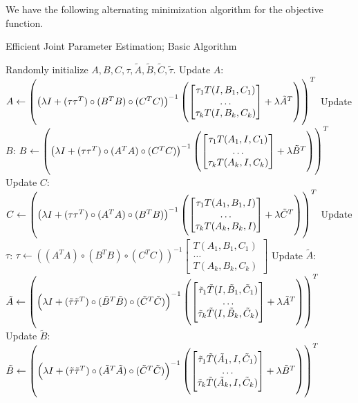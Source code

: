 \documentclass{article}
\begin{document}
We have the following alternating minimization algorithm for the objective function.

\begin{algorithm}
  \caption{Efficient Joint Parameter Estimation; Basic Algorithm}
\begin{algorithmic}[H]
\STATE Randomly initialize $A, B, C, \tau, \tilde A, \tilde B, \tilde C, \tilde \tau$.
\STATE Update $A$: $A \gets \del{\del{\lambda I + (\tau \tau^T) \circ (B^T B) \circ (C^T C)}^{-1} \del{\begin{bmatrix} \tau_1 T(I, B_1, C_1) \\ \ldots \\ \tau_k T(I, B_k, C_k) \end{bmatrix} + \lambda \tilde A^T}}^T$
\STATE Update $B$: $B \gets \del{\del{\lambda I + (\tau \tau^T) \circ (A^T A) \circ (C^T C)}^{-1} \del{\begin{bmatrix} \tau_1 T(A_1, I, C_1) \\ \ldots \\ \tau_k T(A_k, I, C_k) \end{bmatrix} + \lambda \tilde B^T}}^T$
\STATE Update $C$: $C \gets \del{\del{\lambda I + (\tau \tau^T) \circ (A^T A) \circ (B^T B)}^{-1} \del{\begin{bmatrix} \tau_1 T(A_1, B_1, I) \\ \ldots \\ \tau_k T(A_k, B_k, I) \end{bmatrix} + \lambda \tilde C^T}}^T$
\STATE Update $\tau$: $\tau \gets ((A^T A) \circ (B^T B) \circ (C^T C))^{-1}  \begin{bmatrix} T(A_1, B_1, C_1) \\ \ldots \\ T(A_k, B_k, C_k) \end{bmatrix}$
\STATE Update $\tilde A$: $\tilde A \gets \del{\del{\lambda I + (\tilde \tau \tilde \tau^T) \circ (\tilde B^T \tilde B) \circ (\tilde C^T \tilde C)}^{-1} \del{\begin{bmatrix} \tilde\tau_1 \tilde T(I, \tilde B_1, \tilde C_1) \\ \ldots \\ \tilde\tau_k \tilde T(I, \tilde B_k, \tilde C_k) \end{bmatrix} + \lambda {\tilde A}^T}}^T$
\STATE Update $\tilde B$: $\tilde B \gets \del{\del{\lambda I + (\tilde \tau \tilde \tau^T) \circ (\tilde A^T \tilde A) \circ (\tilde C^T \tilde C)}^{-1} \del{\begin{bmatrix} \tilde\tau_1 \tilde T(\tilde A_1, I, \tilde C_1) \\ \ldots \\ \tilde\tau_k \tilde T(\tilde A_k, I, \tilde C_k) \end{bmatrix} + \lambda {\tilde B}^T}}^T$

\end{algorithmic}
\end{algorithm}
\end{document}
